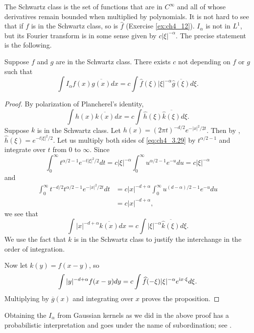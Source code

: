 The Schwartz class is the set of functions that are in $C^\infty$ and all of whose derivatives remain bounded when multiplied by polynomials. It is not hard to see that if $f$ is in the Schwartz class, so is $\widehat{f}$ (Exercise \ref{ex:ch4_12}). $I_\alpha$ is not in $L^1$, but its Fourier transform is in some sense given by $c|\xi|^{-\alpha}$. The precise statement is the following.

\begin{proposition}\label{prop:ch4_3.12}
Suppose $f$ and $g$ are in the Schwartz class. There exists $c$ not depending on $f$ or $g$ such that
\[\int I_\alpha f(x)\overline{g(x)}dx = c\int\widehat{f}(\xi)|\xi|^{-\alpha}\overline{\widehat{g}(\xi)}d\xi.\]
\end{proposition}

\begin{proof}
By polarization of Plancherel's identity,
\mpagebreak
\begin{equation}\label{eq:ch4_3.29}
    \int h(x)\overline{k(x)}dx = c\int\widehat{h}(\xi)\overline{\widehat{k}(\xi)}d\xi.
\end{equation}
Suppose $k$ is in the Schwartz class. Let $h(x) = (2\pi t)^{-d/2}e^{-|x|^2/2t}$. Then by , $\widehat{h}(\xi) = e^{-t|\xi|^2/2}$. Let us multiply both sides of \eqref{eq:ch4_3.29} by $t^{\alpha/2-1}$ and integrate over $t$ from $0$ to $\infty$. Since
\[
    \int_0^\infty t^{\alpha/2-1}e^{-t|\xi|^2/2}dt = c|\xi|^{-\alpha}\int_0^\infty u^{\alpha/2-1}e^{-u}du = c|\xi|^{-\alpha}
\]
and
\begin{align*}
    \int_0^\infty t^{-d/2}t^{\alpha/2-1}e^{-|x|^2/2t}dt &= c|x|^{-d+\alpha}\int_0^\infty u^{(d-\alpha)/2-1}e^{-u}du \\
    &= c|x|^{-d+\alpha},
\end{align*}
we see that
\[
    \int|x|^{-d+\alpha}\overline{k(x)}dx = c\int|\xi|^{-\alpha}\overline{\widehat{k}(\xi)}d\xi.
\]
We use the fact that $k$ is in the Schwartz class to justify the interchange in the order of integration.

Now let $k(y) = f(x-y)$, so
\[
    \int|y|^{-d+\alpha}f(x-y)dy = c\int \widehat{f}(-\xi)|\xi|^{-\alpha}e^{\mathrm{i} x\cdot\xi}d\xi.
\]
Multiplying by $\overline{g}(x)$ and integrating over $x$ proves the proposition.
\end{proof}

Obtaining the $I_\alpha$ from Gaussian kernels as we did in the above proof has a probabilistic interpretation and goes under the name of subordination; see \cite{Feller1971}.

